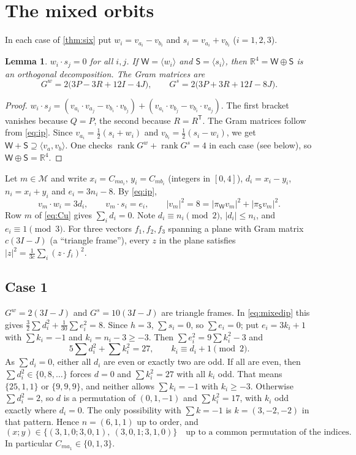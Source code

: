 \documentclass[11pt,a4paper]{amsart}
\newtheorem{lemma}[theorem]{Lemma}
\theoremstyle{definition}
\theoremstyle{remark}
\newcommand{\R}{\mathbb{R}}
\newcommand{\cM}{\mathcal{M}}
\newcommand{\rk}{\operatorname{rank}}
\begin{document}
\section{The mixed orbits}\label{sec:mixed}

In each case of \cref{thm:six} put $w_i=v_{a_i}-v_{b_i}$ and $s_i=v_{a_i}+v_{b_i}$ ($i=1,2,3$).

\begin{lemma}\label{lem:split}
$w_i\cdot s_j=0$ for all $i,j$. If $\mathsf W=\langle w_i\rangle$ and $\mathsf S=\langle s_i\rangle$, then
$\R^4=\mathsf W\oplus\mathsf S$ is an orthogonal decomposition. The Gram matrices are
\[
G^{w}=2\bigl(3P-3R+12I-4J\bigr),\qquad G^{s}=2\bigl(3P+3R+12I-8J\bigr).
\]
\end{lemma}

\begin{proof}
$w_i\cdot s_j=(v_{a_i}\cdot v_{a_j}-v_{b_i}\cdot v_{b_j})+(v_{a_i}\cdot v_{b_j}-v_{b_i}\cdot v_{a_j})$.
The first bracket vanishes because $Q=P$, the second because $R=R^{\mathsf T}$. The Gram matrices follow
from \eqref{eq:ip}. Since $v_{a_i}=\frac12(s_i+w_i)$ and $v_{b_i}=\frac12(s_i-w_i)$, we get
$\mathsf W+\mathsf S\supseteq\langle v_a,v_b\rangle$. One checks $\rk G^w+\rk G^s=4$ in each case (see
below), so $\mathsf W\oplus\mathsf S=\R^4$.
\end{proof}

Let $m\in\cM$ and write $x_i=C_{ma_i}$, $y_i=C_{mb_i}$ (integers in $[0,4]$), $d_i=x_i-y_i$,
$n_i=x_i+y_i$ and $e_i=3n_i-8$. By \eqref{eq:ip},
\begin{equation}\label{eq:mixedip}
v_m\cdot w_i=3d_i,\qquad v_m\cdot s_i=e_i,\qquad |v_m|^2=8=|\pi_{\mathsf W}v_m|^2+|\pi_{\mathsf S}v_m|^2 .
\end{equation}
Row $m$ of \eqref{eq:Cu} gives $\sum_id_i=0$. Note $d_i\equiv n_i\pmod 2$, $|d_i|\le n_i$, and
$e_i\equiv1\pmod 3$. For three vectors $f_1,f_2,f_3$ spanning a plane with Gram matrix $c(3I-J)$ (a
``triangle frame''), every $z$ in the plane satisfies $|z|^2=\frac1{3c}\sum_i(z\cdot f_i)^2$.

\subsection*{Case 1} $G^w=2(3I-J)$ and $G^s=10(3I-J)$ are triangle frames. In \eqref{eq:mixedip} this
gives $\frac32\sum d_i^2+\frac1{30}\sum e_i^2=8$. Since $h=3$, $\sum s_i=0$, so $\sum e_i=0$; put
$e_i=3k_i+1$ with $\sum k_i=-1$ and $k_i=n_i-3\ge-3$. Then $\sum e_i^2=9\sum k_i^2-3$ and
\[
5\textstyle\sum d_i^2+\sum k_i^2=27,\qquad k_i\equiv d_i+1\pmod2.
\]
As $\sum d_i=0$, either all $d_i$ are even or exactly two are odd. If all are even, then $\sum d_i^2\in\{0,8,\dots\}$
forces $d=0$ and $\sum k_i^2=27$ with all $k_i$ odd. That means $\{25,1,1\}$ or $\{9,9,9\}$, and neither
allows $\sum k_i=-1$ with $k_i\ge-3$. Otherwise $\sum d_i^2=2$, so $d$ is a permutation of $(0,1,-1)$ and
$\sum k_i^2=17$, with $k_i$ odd exactly where $d_i=0$. The only possibility with $\sum k=-1$ is
$k=(3,-2,-2)$ in that pattern. Hence $n=(6,1,1)$ up to order, and
\[
(x;y)\in\{(3,1,0;3,0,1),\ (3,0,1;3,1,0)\}\quad\text{up to a common permutation of the indices.}
\]
In particular $C_{ma_1}\in\{0,1,3\}$.
\end{document}
